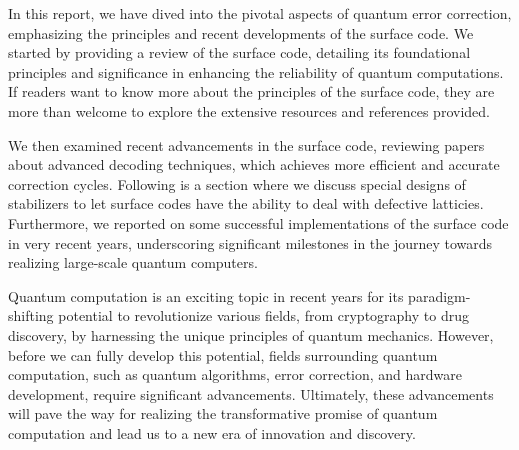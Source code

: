 In this report, we have dived into the pivotal aspects of quantum error correction, emphasizing the principles and recent developments of the surface code. We started by providing a review of the surface code, detailing its foundational principles and significance in enhancing the reliability of quantum computations. If readers want to know more about the principles of the surface code, they are more than welcome to explore the extensive resources and references provided.

We then examined recent advancements in the surface code, reviewing papers about advanced decoding techniques, which achieves more efficient and accurate correction cycles. Following is a section where we discuss special designs of stabilizers to let surface codes have the ability to deal with defective latticies. Furthermore, we reported on some successful implementations of the surface code in very recent years, underscoring significant milestones in the journey towards realizing large-scale quantum computers.

Quantum computation is an exciting topic in recent years for its paradigm-shifting potential to revolutionize various fields, from cryptography to drug discovery, by harnessing the unique principles of quantum mechanics. However, before we can fully develop this potential, fields surrounding quantum computation, such as quantum algorithms, error correction, and hardware development, require significant advancements. Ultimately, these advancements will pave the way for realizing the transformative promise of quantum computation and lead us to a new era of innovation and discovery.